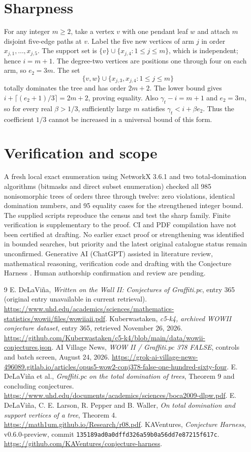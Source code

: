 \documentclass[11pt]{article}
\begin{document}
\section{Sharpness}
For any integer $m\ge2$, take a vertex $v$ with one pendant leaf $w$ and attach $m$ disjoint five-edge paths at $v$. Label the five new vertices of arm $j$ in order $x_{j,1},\ldots,x_{j,5}$. The support set is $\{v\}\cup\{x_{j,4}:1\le j\le m\}$, which is independent; hence $i=m+1$. The degree-two vertices are positions one through four on each arm, so $e_2=3m$. The set
\[
 \{v,w\}\cup\{x_{j,3},x_{j,4}:1\le j\le m\}
\]
totally dominates the tree and has order $2m+2$. The lower bound gives $i+\lceil(e_2+1)/3\rceil=2m+2$, proving equality. Also $\gamma_t-i=m+1$ and $e_2=3m$, so for every real $\beta>1/3$, sufficiently large $m$ satisfies $\gamma_t<i+\beta e_2$. Thus the coefficient $1/3$ cannot be increased in a universal bound of this form.
\section{Verification and scope}
A fresh local exact enumeration using NetworkX 3.6.1 and two total-domination algorithms (bitmasks and direct subset enumeration) checked all 985 nonisomorphic trees of orders three through twelve: zero violations, identical domination numbers, and 95 equality cases for the strengthened integer bound. The supplied scripts reproduce the census and test the sharp family. Finite verification is supplementary to the proof. CI and PDF compilation have not been certified at drafting. No earlier exact proof or strengthening was identified in bounded searches, but priority and the latest original catalogue status remain unconfirmed. Generative AI (ChatGPT) assisted in literature review, mathematical reasoning, verification code and drafting with the Conjecture Harness \cite{harness}. Human authorship confirmation and review are pending.
\begin{thebibliography}{9}
 E. DeLaVi\~na, \emph{Written on the Wall II: Conjectures of Graffiti.pc}, entry 365 (original entry unavailable in current retrieval). \url{https://www.uhd.edu/academics/sciences/mathematics-statistics/wowii/files/wowiiaii.pdf}.
 Kuberwastaken, \emph{c5-k4, archived WOWII conjecture dataset}, entry 365, retrieved November 26, 2026. \url{https://github.com/Kuberwastaken/c5-k4/blob/main/data/wowii-conjectures.json}.
 AI Village News, \emph{WOW II / Graffiti.pc 378 FALSE}, controls and batch screen, August 24, 2026. \url{https://grok-ai-village-news-496089.gitlab.io/articles/opus5-wow2-conj378-false-one-hundred-sixty-four}.
 E. DeLaVi\~na et al., \emph{Graffiti.pc on the total domination of trees}, Theorem 9 and concluding conjectures. \url{https://www.uhd.edu/documents/academics/sciences/boca2009-dlpw.pdf}.
 E. DeLaVi\~na, C. E. Larson, R. Pepper and B. Waller, \emph{On total domination and support vertices of a tree}, Theorem 4. \url{https://math1um.github.io/Research/r08.pdf}.
 KAVentures, \emph{Conjecture Harness}, v0.6.0-preview, commit \texttt{135189ad0a0dffd326a59b0a56dd7e87215f617c}. \url{https://github.com/KAVentures/conjecture-harness}.
\end{thebibliography}
\end{document}
